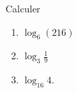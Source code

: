
\begin{exercice}[\boringexo]\label{exorevisions-0001}

	Calculer
	\begin{enumerate}
		\item
			$\log_6(216)$
		\item
			$\log_3\frac{1}{9 }$
		\item
			$\log_{16}4$.
	\end{enumerate}

\end{exercice}
